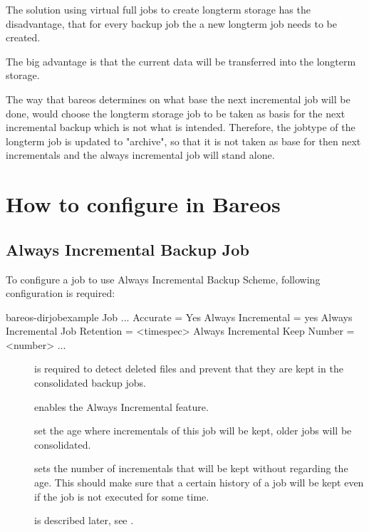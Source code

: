 The solution using virtual full jobs to create longterm storage has the disadvantage, that for every backup job the a new longterm job needs to be created.

The big advantage is that the current data will be transferred into the longterm storage.

The way that bareos determines on what base the next incremental job will be done, would choose the longterm storage job to be taken as basis for the next incremental backup which is not what is intended. Therefore, the jobtype of the 
longterm job is updated to "archive", so that it is not taken as base for then next incrementals and the always incremental job will stand alone.

\section{How to configure in Bareos}

\subsection{Always Incremental Backup Job}

To configure a job to use Always Incremental Backup Scheme, following configuration is required:

\begin{bareosConfigResource}{bareos-dir}{job}{example}
Job {
    ...
    Accurate = Yes
    Always Incremental = yes
    Always Incremental Job Retention = <timespec>
    Always Incremental Keep Number = <number>
    ...
}
\end{bareosConfigResource}

\begin{description}
    \item[] is required to detect deleted files and prevent that they are kept in the consolidated backup jobs.
    \item[] enables the Always Incremental feature.
    \item[] set the age where incrementals of this job will be kept, older jobs will be consolidated.
    \item[] sets the number of incrementals that will be kept without regarding the age. This should make sure that a certain history of a  job will be kept even if the job is not executed for some time.
    \item[] is described later, see .
\end{description}


